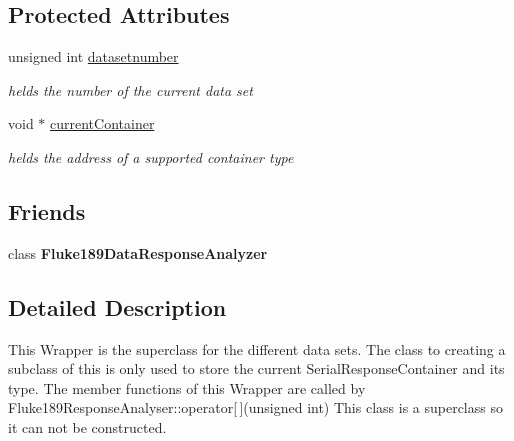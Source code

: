 \subsection*{Protected Attributes}
\begin{DoxyCompactItemize}
\item 
\hypertarget{classFluke_1_1Fluke189DataResponseAnalyzerWrapper_a568ccec1349cc6b278fb0791182bc7b4}{
unsigned int \hyperlink{classFluke_1_1Fluke189DataResponseAnalyzerWrapper_a568ccec1349cc6b278fb0791182bc7b4}{datasetnumber}}
\label{classFluke_1_1Fluke189DataResponseAnalyzerWrapper_a568ccec1349cc6b278fb0791182bc7b4}

\begin{DoxyCompactList}\small\item\em helds the number of the current data set \item\end{DoxyCompactList}\item 
\hypertarget{classFluke_1_1Fluke189DataResponseAnalyzerWrapper_aa0096243be3694f7993022733703697a}{
void $\ast$ \hyperlink{classFluke_1_1Fluke189DataResponseAnalyzerWrapper_aa0096243be3694f7993022733703697a}{currentContainer}}
\label{classFluke_1_1Fluke189DataResponseAnalyzerWrapper_aa0096243be3694f7993022733703697a}

\begin{DoxyCompactList}\small\item\em helds the address of a supported container type \item\end{DoxyCompactList}\end{DoxyCompactItemize}
\subsection*{Friends}
\begin{DoxyCompactItemize}
\item 
\hypertarget{classFluke_1_1Fluke189DataResponseAnalyzerWrapper_a268eb1bf9fac46f61af93c2c1e309713}{
class {\bfseries Fluke189DataResponseAnalyzer}}
\label{classFluke_1_1Fluke189DataResponseAnalyzerWrapper_a268eb1bf9fac46f61af93c2c1e309713}

\end{DoxyCompactItemize}


\subsection{Detailed Description}
This Wrapper is the superclass for the different data sets. The class to creating a subclass of this is only used to store the current SerialResponseContainer and its type. The member functions of this Wrapper are called by Fluke189ResponseAnalyser::operator\mbox{[}$\,$\mbox{]}(unsigned int) This class is a superclass so it can not be constructed. 

